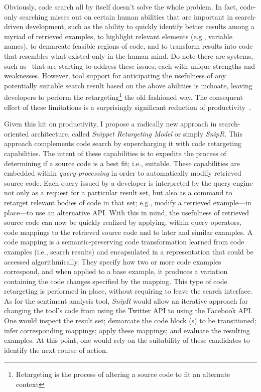 Obviously, code search all by itself doesn't solve the whole problem. In fact, code-only searching misses out on certain human abilities that are important in search-driven development, such as the ability to quickly identify better results among a myriad of retrieved examples, to highlight relevant elements (e.g., variable names), to demarcate feasible regions of code, and to transform results into code that resembles what existed only in the human mind. Do note there are systems, such as~\cite{Bajracharya:2010um, Gysin:2010kt, Hartmann:2010hx, McMillan:2012dj, Sawadsky:2011eh, Wightman:2012gc} that are starting to address these issues; each with unique strengths and weaknesses. However, tool support for anticipating the usefulness of any potentially suitable search result based on the above abilities is inchoate, leaving developers to perform the retargeting\footnote{Retargeting is the process of altering a source code to fit an alternate context} the old fashioned way. The consequent effect of these limitations is a surprisingly significant reduction of productivity~\cite{Cypher:2010ub, Gysin:2010kt}.

Given this hit on productivity, I propose a radically new approach in search-oriented architecture, called \emph{Snippet Retargeting Model} or simply \emph{SnipR}. This approach complements code search by supercharging it with code retargeting capabilities. The intent of these capabilities is to expedite the process of determining if a source code is a best fit; i.e., suitable. These capabilities are embedded within \emph{query processing} in order to automatically modify retrieved source code. Each query issued by a developer is interpreted by the query engine not only as a request for a particular result set, but also as a command to retarget relevant bodies of code in that set; e.g., modify a retrieved example---in place---to use an alternative API. With this in mind, the usefulness of retrieved source code can now be quickly realized by applying, within query operators, code mappings to the retrieved source code and to later and similar examples. A code mapping is a semantic-preserving code transformation learned from code examples (i.e., search results) and encapsulated in a representation that could be accessed algorithmically. They specify how two or more code examples correspond, and when applied to a base example, it produces a variation containing the code changes specified by the mapping. This type of code retargeting is performed in place, without requiring to leave the search interface. As for the sentiment analysis tool, \emph{SnipR} would allow an iterative approach for changing the tool's code from using the Twitter API to using the Facebook API. One would inspect the result set; demarcate the code block (s) to be transitioned; infer corresponding mappings; apply these mappings; and evaluate the resulting examples. At this point, one would rely on the suitability of these candidates to identify the next course of action.    


